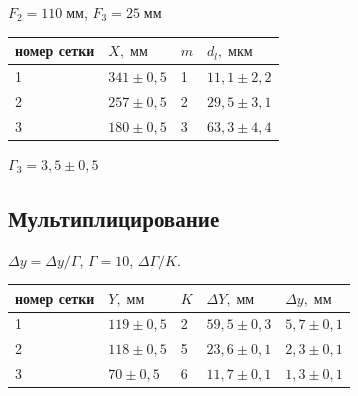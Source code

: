 $F_{2} = 110\;\text{мм}$, $F_{3} = 25\;\text{мм}$

\begin{tabular}{|l|l|l|l|}
\hline
    номер сетки & $X,\;\text{мм}$ & $m$ & $d_{l}, \;\text{мкм}$ \\\hline
    1 & $341 \pm 0{,}5$ & 1 & $11{,}1 \pm 2{,}2$ \\\hline
    2 & $257 \pm 0{,}5$ & 2 & $29{,}5 \pm 3{,}1$ \\\hline
    3 & $180 \pm 0{,}5$ & 3 & $63{,}3 \pm 4{,}4$ \\\hline
\end{tabular}

$\Gamma_{3} = 3{,}5 \pm 0{,}5$

\subsection{Мультиплицирование}
\begin{figure}[ht!]
\end{figure}

$\Delta y = \Delta y / \Gamma$, $\Gamma = 10$, $\Delta \Gamma / K$.

\begin{tabular}{|l|l|l|l|l|}
\hline
    номер сетки & $Y,\;\text{мм}$ & $K$ & $\Delta Y,\;\text{мм}$ & $\Delta y,\;\text{мм}$ \\\hline
    1 & $119 \pm 0{,}5$ & 2 & $59{,}5 \pm 0{,}3$ & $5{,}7 \pm 0{,}1$ \\\hline
    2 & $118 \pm 0{,}5$ & 5 & $23{,}6 \pm 0{,}1$ & $2{,}3 \pm 0{,}1$ \\\hline
    3 & $70 \pm 0{,}5$ & 6 & $11{,}7 \pm 0{,}1$ & $1{,}3 \pm 0{,}1$ \\\hline
\end{tabular}

\begin{figure}[ht!]
\end{figure}


